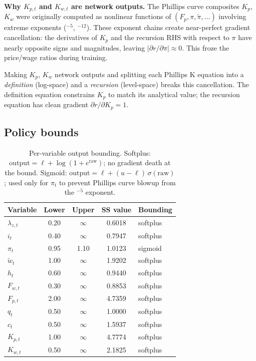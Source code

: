 \documentclass[11pt]{article}
\begin{document}
\medskip\noindent\textbf{Why $K_{p,t}$ and $K_{w,t}$ are network outputs.}\;
The Phillips curve composites $K_p$, $K_w$ were originally computed as
nonlinear functions of $(F_p, \pi, \tilde\pi, \ldots)$ involving extreme
exponents (${}^{-5}$, ${}^{-12}$). These exponent chains create near-perfect
gradient cancellation: the derivatives of $K_p$ and the recursion RHS with
respect to $\pi$ have nearly opposite signs and magnitudes, leaving
$|\partial r/\partial \pi| \approx 0$. This froze the price/wage ratios
during training.

Making $K_p$, $K_w$ network outputs and splitting each Phillips K equation
into a \emph{definition} (log-space) and a \emph{recursion} (level-space)
breaks this cancellation. The definition equation constrains $K_p$ to match
its analytical value; the recursion equation has clean gradient $\partial r/\partial K_p = 1$.

\subsection{Policy bounds}

\begin{table}[h]
\centering
\begin{tabular}{lcccl}
\toprule
Variable & Lower & Upper & SS value & Bounding \\
\midrule
$\lambda_{z,t}$ & 0.20 & $\infty$ & 0.6018 & softplus \\
$i_t$            & 0.40 & $\infty$ & 0.7947 & softplus \\
$\pi_t$          & 0.95 & 1.10     & 1.0123 & sigmoid \\
$\tilde{w}_t$    & 1.00 & $\infty$ & 1.9202 & softplus \\
$h_t$            & 0.60 & $\infty$ & 0.9440 & softplus \\
$F_{w,t}$        & 0.30 & $\infty$ & 0.8853 & softplus \\
$F_{p,t}$        & 2.00 & $\infty$ & 4.7359 & softplus \\
$q_t$            & 0.50 & $\infty$ & 1.0000 & softplus \\
$c_t$            & 0.50 & $\infty$ & 1.5937 & softplus \\
$K_{p,t}$        & 1.00 & $\infty$ & 4.7774 & softplus \\
$K_{w,t}$        & 0.50 & $\infty$ & 2.1825 & softplus \\
\bottomrule
\end{tabular}
\caption{Per-variable output bounding. Softplus:
$\text{output} = \ell + \log(1+e^{\text{raw}})$; no gradient death at the bound.
Sigmoid: $\text{output} = \ell + (u-\ell)\,\sigma(\text{raw})$; used only for
$\pi_t$ to prevent Phillips curve blowup from the ${}^{-5}$ exponent.}
\end{table}
\end{document}
